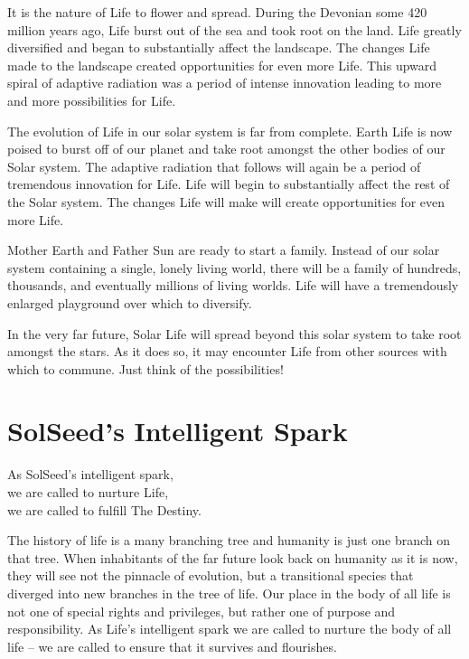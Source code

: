 \documentclass[ebook,12pt,openany,twoside]{memoir}
\newcommand{\tab}{\hspace*{2em}}
\newcommand{\imagefacingchapter}[1]{
  \cleartoverso
  \clearpage \null
  \thispagestyle{cleared}
  \AddToShipoutPictureBG*{%
    \AtStockLowerLeft{%
      \texttt{[image: \#1]}
    }
  }
  \clearpage
}
\begin{document}
\noindent It is the nature of Life to flower and spread. During the Devonian
some 420 million years ago, Life burst out of the sea and took root on the
land. Life greatly diversified and began to substantially affect the landscape.
The changes Life made to the landscape created opportunities for even more
Life. This upward spiral of adaptive radiation was a period of intense
innovation leading to more and more possibilities for Life.

The evolution of Life in our solar system is far from complete. Earth Life is
now poised to burst off of our planet and take root amongst the other bodies of
our Solar system. The adaptive radiation that follows will again be a period of
tremendous innovation for Life. Life will begin to substantially affect the
rest of the Solar system. The changes Life will make will create opportunities
for even more Life.

Mother Earth and Father Sun are ready to start a family. Instead of our solar
system containing a single, lonely living world, there will be a family of
hundreds, thousands, and eventually millions of living worlds. Life will have a
tremendously enlarged playground over which to diversify.

In the very far future, Solar Life will spread beyond this solar system to take
root amongst the stars. As it does so, it may encounter Life from other sources
with which to commune.  Just think of the possibilities!

\imagefacingchapter{images/TakeRootAmongstTheStars-comp}
\chapter{SolSeed's Intelligent Spark}

\setlength\epigraphwidth{2.7in}
\epigraph{
  As SolSeed's intelligent spark,\\
  \tab we are called to nurture Life,\\
  \tab we are called to fulfill The Destiny.
}{}

\noindent The history of life is a many branching tree and humanity is just one
branch on that tree. When inhabitants of the far future look back on humanity
as it is now, they will see not the pinnacle of evolution, but a transitional
species that diverged into new branches in the tree of life. Our place in the
body of all life is not one of special rights and privileges, but rather one of
purpose and responsibility. As Life's intelligent spark we are called to
nurture the body of all life -- we are called to ensure that it survives and
flourishes.
\end{document}
